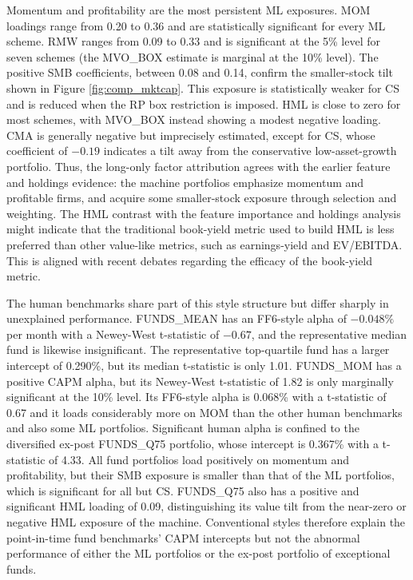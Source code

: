 \documentclass[preprint,12pt,authoryear]{elsarticle}
\begin{document}
Momentum and profitability are the most persistent ML exposures. MOM loadings range from 0.20 to 0.36 and are statistically significant for every ML scheme. RMW ranges from 0.09 to 0.33 and is significant at the 5\% level for seven schemes (the MVO\_BOX estimate is marginal at the 10\% level). The positive SMB coefficients, between 0.08 and 0.14, confirm the smaller-stock tilt shown in Figure \ref{fig:comp_mktcap}. This exposure is statistically weaker for CS and is reduced when the RP box restriction is imposed. HML is close to zero for most schemes, with MVO\_BOX instead showing a modest negative loading. CMA is generally negative but imprecisely estimated, except for CS, whose coefficient of $-0.19$ indicates a tilt away from the conservative low-asset-growth portfolio. Thus, the long-only factor attribution agrees with the earlier feature and holdings evidence: the machine portfolios emphasize momentum and profitable firms, and acquire some smaller-stock exposure through selection and weighting. The HML contrast with the feature importance and holdings analysis might indicate that the traditional book-yield metric used to build HML is less preferred than other value-like metrics, such as earnings-yield and EV/EBITDA. This is aligned with recent debates regarding the efficacy of the book-yield metric.

The human benchmarks share part of this style structure but differ sharply in unexplained performance. FUNDS\_MEAN has an FF6-style alpha of $-0.048\%$ per month with a Newey-West t-statistic of $-0.67$, and the representative median fund is likewise insignificant. The representative top-quartile fund has a larger intercept of 0.290\%, but its median t-statistic is only 1.01. FUNDS\_MOM has a positive CAPM alpha, but its Newey-West t-statistic of 1.82 is only marginally significant at the 10\% level. Its FF6-style alpha is 0.068\% with a t-statistic of 0.67 and it loads considerably more on MOM than the other human benchmarks and also some ML portfolios. Significant human alpha is confined to the diversified ex-post FUNDS\_Q75 portfolio, whose intercept is 0.367\% with a t-statistic of 4.33. All fund portfolios load positively on momentum and profitability, but their SMB exposure is smaller than that of the ML portfolios, which is significant for all but CS. FUNDS\_Q75 also has a positive and significant HML loading of 0.09, distinguishing its value tilt from the near-zero or negative HML exposure of the machine. Conventional styles therefore explain the point-in-time fund benchmarks' CAPM intercepts but not the abnormal performance of either the ML portfolios or the ex-post portfolio of exceptional funds.
\end{document}
